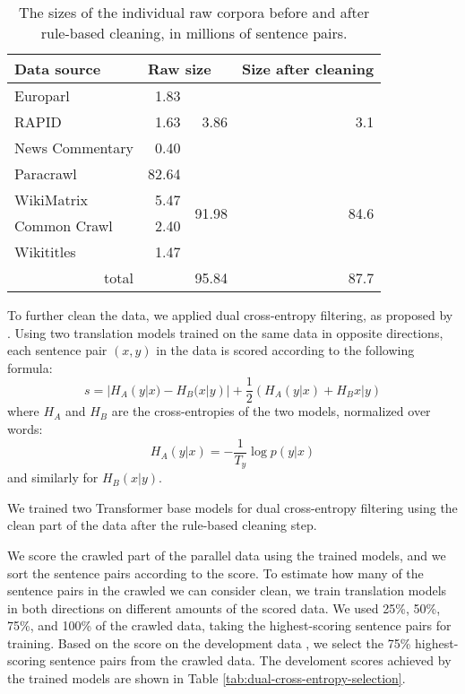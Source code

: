 \begin{table}
  \centering
  \begin{tabular}{lrrr}
    \toprule
    Data source & \multicolumn{2}{l}{Raw size} & \multicolumn{1}{l}{Size after cleaning} \\
    \midrule
    Europarl & 1.83 & \multirow{3}{*}{3.86} & \multirow{3}{*}{3.1} \\
    RAPID & 1.63 & &\\
    News Commentary & 0.40 & & \\
    \midrule
    Paracrawl & 82.64 &  \multirow{4}{*}{91.98} & \multirow{4}{*}{84.6} \\
    WikiMatrix & 5.47 & & \\
    Common Crawl & 2.40 & & \\
    Wikititles & 1.47 & & \\
    \midrule
    \multicolumn{1}{r}{total} & & 95.84 & 87.7 \\
    \bottomrule
  \end{tabular}

  \caption{The sizes of the individual raw corpora before and after rule-based
    cleaning, in millions of sentence pairs.}%
  \label{tab:ende-data-sizes}
\end{table}

To further clean the data, we applied dual cross-entropy filtering, as proposed
by \citet{junczys-dowmunt-2018-dual}. Using two translation models trained on
the same data in opposite directions, each sentence pair $(x, y)$ in the data
is scored according to the following formula:
%
\begin{equation}
  s = |H_A(y|x) - H_B(x|y)| + \frac{1}{2} (H_A(y|x) + H_B{x|y})
\end{equation}
where $H_A$ and $H_B$ are the cross-entropies of the two models, normalized
over words:
%
\begin{equation}
  H_A(y|x) = - \frac{1}{T_y} \log p(y|x)
\end{equation}
and similarly for $H_B(x|y)$.

We trained two Transformer base models for dual cross-entropy filtering using
the clean part of the data after the rule-based cleaning step.  

We score the crawled part of the parallel data using the trained models, and we
sort the sentence pairs according to the score. To estimate how many of the
sentence pairs in the crawled we can consider clean, we train translation
models in both directions on different amounts of the scored data. We used
25\%, 50\%, 75\%, and 100\% of the crawled data, taking the highest-scoring
sentence pairs for training. Based on the score on the development data
, we select the 75\% highest-scoring sentence pairs from the crawled
data.  The develoment
scores achieved by the trained models are shown in Table
\ref{tab:dual-cross-entropy-selection}. 

